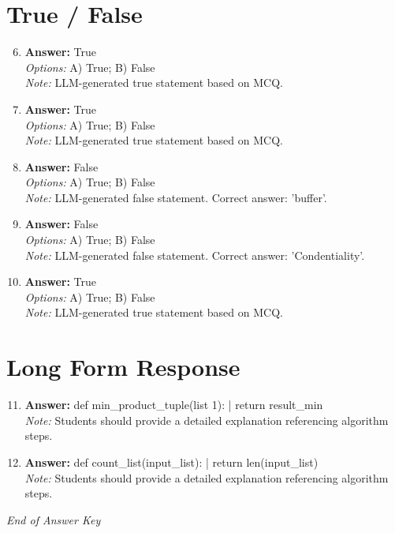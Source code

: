 \documentclass[12pt]{article}
\begin{document}
\section*{True / False}
\begin{enumerate}[label=\arabic*.]
\setcounter{enumi}{5}
\item \textbf{Answer:} True
\\ \textit{Options:} A) True; B) False
\\ \textit{Note:} LLM-generated true statement based on MCQ.
\item \textbf{Answer:} True
\\ \textit{Options:} A) True; B) False
\\ \textit{Note:} LLM-generated true statement based on MCQ.
\item \textbf{Answer:} False
\\ \textit{Options:} A) True; B) False
\\ \textit{Note:} LLM-generated false statement. Correct answer: 'buffer'.
\item \textbf{Answer:} False
\\ \textit{Options:} A) True; B) False
\\ \textit{Note:} LLM-generated false statement. Correct answer: 'Condentiality'.
\item \textbf{Answer:} True
\\ \textit{Options:} A) True; B) False
\\ \textit{Note:} LLM-generated true statement based on MCQ.
\end{enumerate}

\section*{Long Form Response}
\begin{enumerate}[label=\arabic*.]
\setcounter{enumi}{10}
\item \textbf{Answer:} def min\_product\_tuple(list 1): | return result\_min
\\ \textit{Note:} Students should provide a detailed explanation referencing algorithm steps.
\item \textbf{Answer:} def count\_list(input\_list): | return len(input\_list)
\\ \textit{Note:} Students should provide a detailed explanation referencing algorithm steps.
\end{enumerate}

\vfill
\noindent\textit{End of Answer Key}
\end{document}
